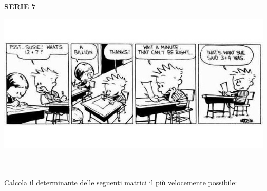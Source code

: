 \documentclass[a4paper,10pt]{article}
\begin{document}
\pagestyle{plain}


\begin{center}
    \LARGE{\bf SERIE 7}

    \includegraphics[scale=0.5]{./img.jpg}
\end{center}


\smallskip



 \\\\
Calcola il determinante delle seguenti matrici il più velocemente possibile:
\end{document}
